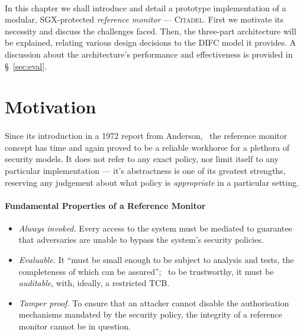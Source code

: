 

\paragraph{} In this chapter we shall introduce and detail a prototype implementation of a modular, SGX-protected \textit{reference monitor} --- \textsc{Citadel}. First we motivate its necessity and discuss the challenges faced. Then, the three-part architecture will be explained, relating various design decisions to the DIFC model it provides. A discussion about the architecture's performance and effectiveness is provided in §~\ref{sec:eval}.

\section{Motivation}
\paragraph{} Since its introduction in a 1972 report from Anderson,~\cite{reference-monitor} the reference monitor concept has time and again proved to be a reliable workhorse for a plethora of security models. It does not refer to any exact policy, nor limit itself to any particular implementation --- it's abstractness is one of its greatest strengths, reserving any judgement about what policy is \textit{appropriate} in a particular setting.~\cite{irvine-rm}

\paragraph{Fundamental Properties of a Reference Monitor}

\begin{itemize}
    \item \textit{Always invoked.} Every access to the system must be mediated to guarantee that adversaries are unable to bypass the system's security policies.
    \item \textit{Evaluable.} It ``must be small enough to be subject to analysis and tests, the completeness of which can be assured'';~\cite{reference-monitor} to be trustworthy, it must be \textit{auditable}, with, ideally, a restricted TCB.
    \item \textit{Tamper proof.} To ensure that an attacker cannot disable the authorisation mechanisms mandated by the security policy, the integrity of a reference monitor cannot be in question.
\end{itemize}

